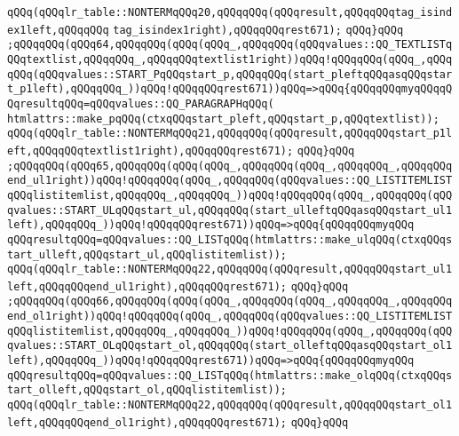 \verb|qQQq(qQQqlr_table::NONTERMqQQq20,qQQqqQQq(qQQqresult,qQQqqQQqtag_isindex1left,qQQqqQQq|\newline
\verb|tag_isindex1right),qQQqqQQqrest671);|\newline
\verb|qQQq}qQQq|\newline
\verb|;qQQqqQQq(qQQq64,qQQqqQQq(qQQq(qQQq_,qQQqqQQq(qQQqvalues::QQ_TEXTLISTqQQqtextlist,qQQqqQQq_,qQQqqQQqtextlist1right))qQQq!qQQqqQQq(qQQq_,qQQqqQQq(qQQqvalues::START_PqQQqstart_p,qQQqqQQq(start_pleftqQQqasqQQqstart_p1left),qQQqqQQq_))qQQq!qQQqqQQqrest671))qQQq=>qQQq{qQQqqQQqmyqQQqqQQqresultqQQq=qQQqvalues::QQ_PARAGRAPHqQQq(|\newline
\verb|htmlattrs::make_pqQQq(ctxqQQqstart_pleft,qQQqstart_p,qQQqtextlist));|\newline
\verb|qQQq(qQQqlr_table::NONTERMqQQq21,qQQqqQQq(qQQqresult,qQQqqQQqstart_p1left,qQQqqQQqtextlist1right),qQQqqQQqrest671);|\newline
\verb|qQQq}qQQq|\newline
\verb|;qQQqqQQq(qQQq65,qQQqqQQq(qQQq(qQQq_,qQQqqQQq(qQQq_,qQQqqQQq_,qQQqqQQqend_ul1right))qQQq!qQQqqQQq(qQQq_,qQQqqQQq(qQQqvalues::QQ_LISTITEMLISTqQQqlistitemlist,qQQqqQQq_,qQQqqQQq_))qQQq!qQQqqQQq(qQQq_,qQQqqQQq(qQQqvalues::START_ULqQQqstart_ul,qQQqqQQq(start_ulleftqQQqasqQQqstart_ul1left),qQQqqQQq_))qQQq!qQQqqQQqrest671))qQQq=>qQQq{qQQqqQQqmyqQQq|\newline
\verb|qQQqresultqQQq=qQQqvalues::QQ_LISTqQQq(htmlattrs::make_ulqQQq(ctxqQQqstart_ulleft,qQQqstart_ul,qQQqlistitemlist));|\newline
\verb|qQQq(qQQqlr_table::NONTERMqQQq22,qQQqqQQq(qQQqresult,qQQqqQQqstart_ul1left,qQQqqQQqend_ul1right),qQQqqQQqrest671);|\newline
\verb|qQQq}qQQq|\newline
\verb|;qQQqqQQq(qQQq66,qQQqqQQq(qQQq(qQQq_,qQQqqQQq(qQQq_,qQQqqQQq_,qQQqqQQqend_ol1right))qQQq!qQQqqQQq(qQQq_,qQQqqQQq(qQQqvalues::QQ_LISTITEMLISTqQQqlistitemlist,qQQqqQQq_,qQQqqQQq_))qQQq!qQQqqQQq(qQQq_,qQQqqQQq(qQQqvalues::START_OLqQQqstart_ol,qQQqqQQq(start_olleftqQQqasqQQqstart_ol1left),qQQqqQQq_))qQQq!qQQqqQQqrest671))qQQq=>qQQq{qQQqqQQqmyqQQq|\newline
\verb|qQQqresultqQQq=qQQqvalues::QQ_LISTqQQq(htmlattrs::make_olqQQq(ctxqQQqstart_olleft,qQQqstart_ol,qQQqlistitemlist));|\newline
\verb|qQQq(qQQqlr_table::NONTERMqQQq22,qQQqqQQq(qQQqresult,qQQqqQQqstart_ol1left,qQQqqQQqend_ol1right),qQQqqQQqrest671);|\newline
\verb|qQQq}qQQq|\newline
